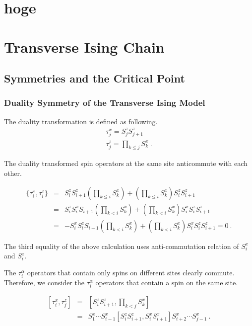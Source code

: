 \documentclass[11pt, a4]{report}
\begin{document}
\chapter{hoge}

\chapter{Transverse Ising Chain}

\section{Symmetries and the Critical Point}

\subsection{Duality Symmetry of the Transverse Ising Model}

The duality transformation is defined as following.
\begin{eqnarray}
\tau_{j}^x = S_{j}^z S_{j+1}^z \\
\tau_{j}^z = \prod_{k \le j} S_k^x \ .
\end{eqnarray}

The duality transformed spin operators at the same site anticommute with each other.

\begin{eqnarray}
 \{ \tau_{i}^x , \tau_{i}^z  \} &=& S_{i}^z S_{i+1}^z \left ( \prod_{k \le i} S_{k}^x \right ) + \left ( \prod_{k \le i}  S_{k}^x \right ) S_{i}^z S_{i+1}^z \nonumber \\
&=&
S_{i}^z S_{i}^x S_{i+1} \left ( \prod_{k < i} S_{k}^x \right ) + \left ( \prod_{k < i}  S_{k}^x \right ) S_{i}^x S_{i}^z S_{i+1}^z \nonumber \\
&=&
- S_{i}^x S_{i}^z  S_{i+1} \left ( \prod_{k < i} S_{k}^x \right ) + \left ( \prod_{k < i}  S_{k}^x \right ) S_{i}^x S_{i}^z S_{i+1}^z = 0 \ .
\end{eqnarray}

The third equality of the above calculation uses anti-commutation relation of $S_i^x$ and $S_i^z$.

The $\tau_{i}^{\alpha}$ operators that contain only spins on different sites clearly commute.
Therefore, we consider the $\tau_{i}^{\alpha}$ operators that contain a spin on the same site.

\begin{eqnarray}
 \left [
\tau_{i}^x, \tau_{j}^z
\right ]
&=&
\left [
S_{i}^z S_{i+1}^z, \prod_{k < j} S_k^x
 \right ] \nonumber \\
&=&
S_{1}^x \cdots S_{i-1}^x
 \left [
S_{i}^z S_{i+1}^z,
S_{i}^x S_{i+1}^x
 \right ]
S_{i+2}^x \cdots S_{j-1}^x \ .
\end{eqnarray}
\end{document}
